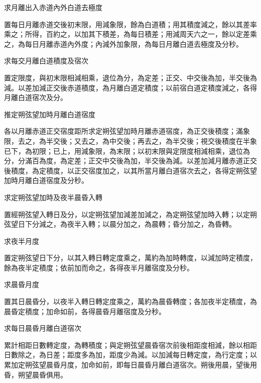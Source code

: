 \begin{pinyinscope}
 求月離出入赤道內外白道去極度



 置每日月離赤道交後初末限，用減象限，餘為白道積；用其積度減之，餘以其差率乘之；所得，百約之，以加其下積差，為每日積差；用減周天六之一，餘以定差乘之，為每日月離赤道內外度；內減外加象限，為每日月離白道去極度及分秒。



 求每交月離白道積度及宿次



 置定限度，與初末限相減相乘，退位為分，為定差；正交、中交後為加，半交後為減。以差加減正交後赤道積度，為月離白道定積度；以前宿白道定積度減之，各得月離白道宿次及分。



 推定朔弦望加時月離白道宿度



 各以月離赤道正交宿度距所求定朔弦望加時月離赤道宿度，為正交後積度；滿象限，去之，為半交後；又去之，為中交後；再去之，為半交後；視交後積度在半象已下，為初限；已上，用減象限，為末限；以初末限與定限度相減相乘，退位為分，分滿百為度，為定差；正交中交後為加，半交後為減。以差加減月離赤道正交後積度，為定積度，以正交宿度加之，以其所當月離白道宿次去之，各得定朔弦望加時月離白道宿度及分秒。



 求定朔弦望加時及夜半晨昏入轉



 置經朔弦望入轉日及分，以定朔弦望加減差加減之，為定朔弦望加時入轉；以定朔弦望日下分減之，為夜半入轉；以晨分加之，為晨轉；昏分加之，為昏轉。



 求夜半月度



 置定朔弦望日下分，以其入轉日轉定度乘之，萬約為加時轉度，以減加時定積度，餘為夜半定積度；依前加而命之，各得夜半月離宿度及分秒。



 求晨昏月度



 置其日晨昏分，以夜半入轉日轉定度乘之，萬約為晨昏轉度；各加夜半定積度，為晨昏定積度；加命如前，各得晨昏月離宿度及分秒。



 求每日晨昏月離白道宿次



 累計相距日數轉定度，為轉積度；與定朔弦望晨昏宿次前後相距度相減，餘以相距日數除之，為日差；距度多為加，距度少為減。以加減每日轉定度，為行定度；以累加定朔弦望晨昏月度，加命如前，即每日晨昏月離白道宿次。朔後用晨，望後用昏，朔望晨昏俱用。



\end{pinyinscope}